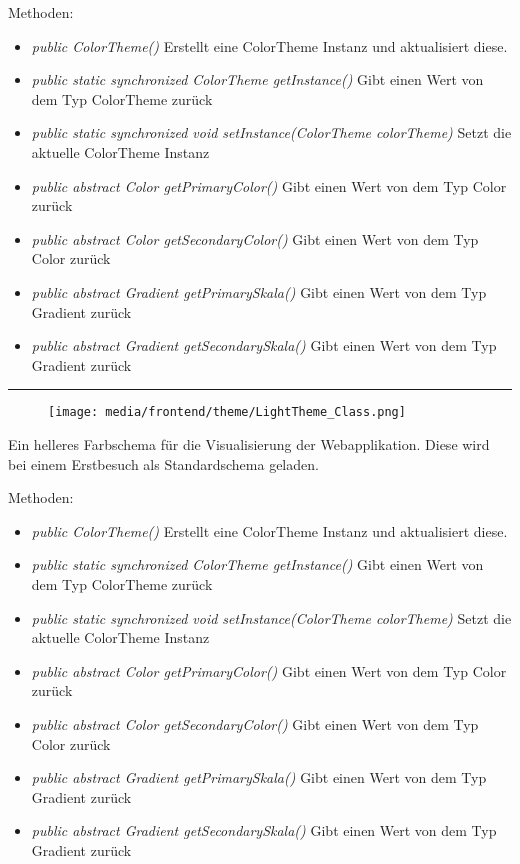 \begin{itemize}
Methoden:
\begin{itemize} 
    \item \emph{public ColorTheme()} Erstellt eine ColorTheme Instanz und aktualisiert diese.
    \item \emph{public static synchronized ColorTheme getInstance()} Gibt einen Wert von dem Typ ColorTheme zurück
    \item \emph{public static synchronized void setInstance(ColorTheme colorTheme)} Setzt die aktuelle ColorTheme Instanz
    \item \emph{public abstract Color getPrimaryColor()} Gibt einen Wert von dem Typ Color zurück
    \item \emph{public abstract Color getSecondaryColor()} Gibt einen Wert von dem Typ Color zurück
    \item \emph{public abstract Gradient getPrimarySkala()} Gibt einen Wert von dem Typ Gradient zurück
    \item \emph{public abstract Gradient getSecondarySkala()}  Gibt einen Wert von dem Typ Gradient zurück
\end{itemize}

\rule{\textwidth}{0.4pt} 

\begin{minipage}{0.3\textwidth}
    \begin{figure}[H]
        \texttt{[image: media/frontend/theme/LightTheme\_Class.png]}
    \end{figure}
    \end{minipage} \hfill
    \begin{minipage}{0.6\textwidth}
        Ein helleres Farbschema für die Visualisierung der Webapplikation. Diese wird bei einem Erstbesuch als Standardschema geladen.
    \end{minipage}

Methoden:
\begin{itemize} 
    \item \emph{public ColorTheme()} Erstellt eine ColorTheme Instanz und aktualisiert diese.
    \item \emph{public static synchronized ColorTheme getInstance()} Gibt einen Wert von dem Typ ColorTheme zurück
    \item \emph{public static synchronized void setInstance(ColorTheme colorTheme)} Setzt die aktuelle ColorTheme Instanz
    \item \emph{public abstract Color getPrimaryColor()} Gibt einen Wert von dem Typ Color zurück
    \item \emph{public abstract Color getSecondaryColor()} Gibt einen Wert von dem Typ Color zurück
    \item \emph{public abstract Gradient getPrimarySkala()} Gibt einen Wert von dem Typ Gradient zurück
    \item \emph{public abstract Gradient getSecondarySkala()}  Gibt einen Wert von dem Typ Gradient zurück
\end{itemize}


\end{itemize}
